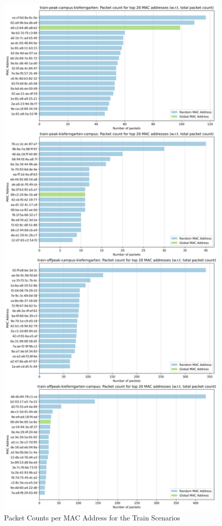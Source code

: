 \documentclass[sigconf,nonacm]{acmart}
\begin{document}
\begin{figure}
    \centering
    \includegraphics[width=\columnwidth]{images/part1/packet-counts/top-macs-train-scenarios.png}
    \caption{Packet Counts per MAC Address for the Train Scenarios}
    \label{fig:train_packet_counts_per_mac}
\end{figure}
\end{document}
